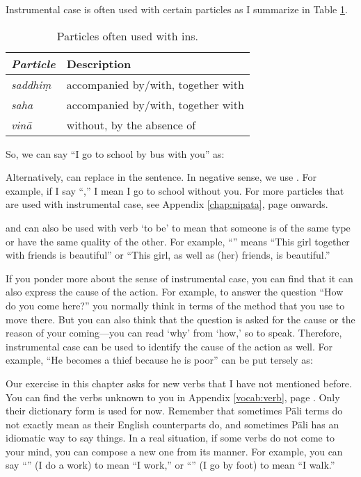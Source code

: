Instrumental case is often used with certain particles as I summarize in Table \ref{tab:indins}.

\begin{table}[!hbt]
\centering
\caption{Particles often used with ins.}
\label{tab:indins}
\bigskip
\begin{tabular}{@{}>{\itshape}ll@{}} \toprule
\bfseries\upshape Particle & \bfseries Description \\ \midrule
saddhi\d m & accompanied by/with, together with \\
saha & accompanied by/with, together with \\
vin\=a & without, by the absence of \\
\bottomrule
\end{tabular}
\end{table}

So, we can say ``I go to school by bus with you'' as:


Alternatively,  can replace  in the sentence. In negative sense, we use . For example, if I say ``,'' I mean I go to school without you. For more particles that are used with instrumental case, see Appendix \ref{chap:nipata}, page \pageref{nip:saha} onwards.

 and  can also be used with verb `to be' to mean that someone is of the same type or have the same quality of the other. For example, ``'' means ``This girl together with friends is beautiful'' or ``This girl, as well as (her) friends, is beautiful.''

If you ponder more about the sense of instrumental case, you can find that it can also express the cause of the action. For example, to answer the question ``How do you come here?'' you normally think in terms of the method that you use to move there. But you can also think that the question is asked for the cause or the reason of your coming---you can read `why' from `how,' so to speak. Therefore, instrumental case can be used to identify the cause of the action as well. For example, ``He becomes a thief because he is poor'' can be put tersely as:


Our exercise in this chapter asks for new verbs that I have not mentioned before. You can find the verbs unknown to you in Appendix \ref{vocab:verb}, page \pageref{vocab:verb}. Only their dictionary form is used for now. Remember that sometimes P\=ali terms do not exactly mean as their English counterparts do, and sometimes P\=ali has an idiomatic way to say things. In a real situation, if some verbs do not come to your mind, you can compose a new one from its manner. For example, you can say ``'' (I do a work) to mean ``I work,'' or ``'' (I go by foot) to mean ``I walk.''

